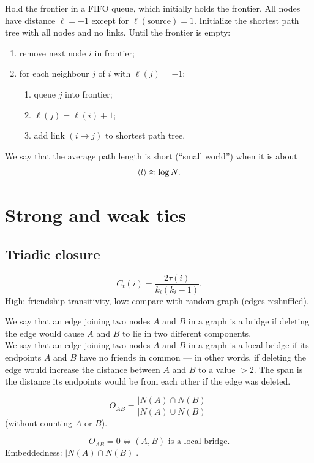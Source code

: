 \documentclass[a4paper,9pt]{extarticle}
\begin{document}
\begin{multicols*}{2}
\begin{riquadro}
		Hold the frontier in a FIFO queue, which initially holds the frontier. All nodes have distance $\ell=-1$ except for $\ell(\text{source})=1$. Initialize the shortest path tree with all nodes and no links. Until the frontier is empty:
		\begin{enumerate}
			\item remove next node $i$ in frontier;
			\item for each neighbour $j$ of $i$ with $\ell(j)=-1$:
			\begin{enumerate}
				\item queue $j$ into frontier;
				\item $\ell(j)=\ell(i)+1$;
				\item add link $(i\to j)$ to shortest path tree.
			\end{enumerate}
		\end{enumerate}
	\end{riquadro}
	We say that the average path length is short (``small world'') when it is about
	\begin{equation*}
		\langle l \rangle\approx \log N.
	\end{equation*}
	\section{Strong and weak ties}
	\subsection{Triadic closure}
	\begin{riquadro}
		$$C_{t}(i)=\frac{2\tau(i)}{k_{i}(k_{i}-1)}.$$
		High: friendship transitivity, low: compare with random graph (edges reshuffled).
	\end{riquadro}
	We say that an edge joining two nodes $A$ and $B$ in a graph is a bridge if deleting the edge
	would cause $A$ and $B$ to lie in two different components.\\
	We say that an edge joining two nodes $A$ and $B$ in a graph is a local bridge if its
	endpoints $A$ and $B$ have no friends in common — in other words, if deleting the edge
	would increase the distance between $A$ and $B$ to a value $> 2$. The span is the distance its endpoints would be from each other if the edge was deleted.
	\begin{riquadro}
		\begin{equation*}
			O_{AB}=\frac{|N(A)\cap N(B)|}{|N(A)\cup N(B)|}
		\end{equation*}
		(without counting $A$ or $B$).
	\end{riquadro}
	\begin{equation*}
		O_{AB}=0\iff(A,B)\text{ is a local bridge}.
	\end{equation*}
	Embeddedness: $|N(A)\cap N(B)|$.

\end{multicols*}
\end{document}

